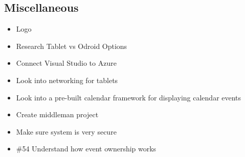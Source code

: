 \subsection*{Miscellaneous}
\begin{itemize}
\item Logo
\item Research Tablet vs Odroid Options
\item Connect Visual Studio to Azure
\item Look into networking for tablets
\item Look into a pre-built calendar framework for displaying calendar events
\item Create middleman project
\item Make sure system is very secure
\item \#54 Understand how event ownership works
\end{itemize}




